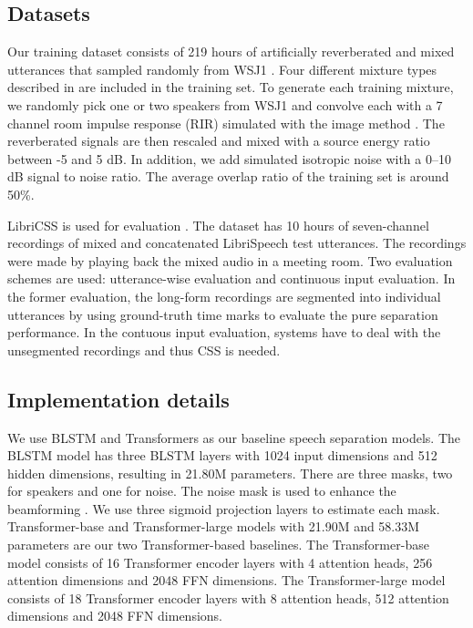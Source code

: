 \documentclass{article}
\begin{document}
	\subsection{Datasets}
	Our training dataset consists of 219 hours of artificially reverberated and mixed utterances that sampled randomly from WSJ1 \cite{wsj1}. Four different mixture types described in \cite{yoshioka2018multi} are included in the training set. To generate each training mixture, we randomly pick one or two speakers from  WSJ1 
	and convolve each with a 7 channel room impulse response (RIR) simulated with the image method \cite{imagemethod}. The reverberated signals are then rescaled and mixed with a source energy ratio  between -5 and 5 dB. In addition, we add simulated isotropic noise \cite{habets2007generating} with a 0--10 dB signal to noise ratio. The average overlap ratio of the training set is around 50\%. 
	
	LibriCSS is used for evaluation \cite{chen2020continuous}. 
	The dataset has 10 hours of seven-channel recordings of mixed and concatenated LibriSpeech test utterances. The recordings were made by playing back the mixed audio in a meeting room. 
	Two evaluation schemes are used: utterance-wise evaluation and continuous input evaluation. 
	In the former evaluation, the long-form recordings are segmented into individual utterances by using ground-truth time marks to evaluate the pure separation performance. 
	In the contuous input evaluation, systems have to deal with the unsegmented recordings and thus CSS is needed. 
	






	
	\subsection{Implementation details}
	We use BLSTM and Transformers as our baseline speech separation models.
	The BLSTM model has three BLSTM layers with 1024 input dimensions and 512 hidden dimensions, resulting in 21.80M parameters. There are three masks, two for speakers and one for noise. The noise mask is used to enhance the beamforming \cite{Yoshioka2018Unmix}.
	We use three sigmoid projection layers to estimate each mask.  Transformer-base and Transformer-large models with 21.90M and 58.33M parameters are our two Transformer-based baselines. The Transformer-base model consists of 16 Transformer encoder layers with 4 attention heads, 256 attention dimensions and 2048 FFN dimensions. The Transformer-large model consists of 18 Transformer encoder layers with 8 attention heads, 512 attention dimensions and 2048 FFN dimensions.
	
\end{document}
